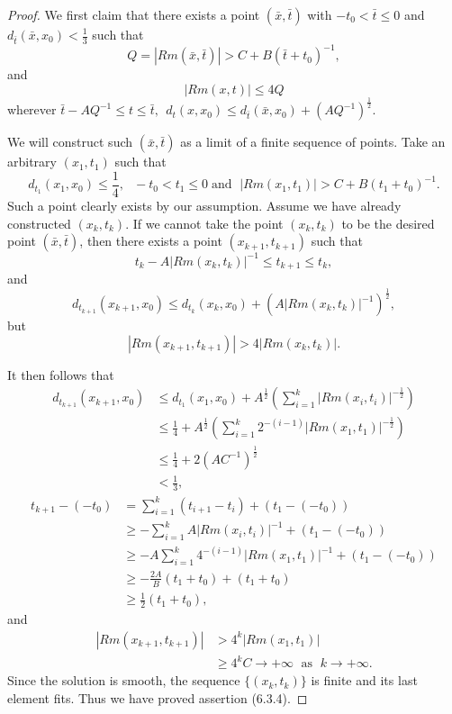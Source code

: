 \begin{proof}
We first claim that there exists a point $(\bar{x},\bar{t})$ with
$-t_0<\bar{t}\leq 0$ and $d_{\bar{t}}(\bar{x},x_0)<\frac{1}{3}$
such that
$$
Q=|Rm(\bar{x},\bar{t})|>C+ B(\bar{t}+t_0)^{-1},
$$
and \begin{equation}
|Rm(x,t)|\leq 4Q %
\end{equation} wherever $\bar{t}-AQ^{-1}\leq t\leq \bar{t},\ \ d_t(x,x_0)\leq
d_{\bar{t}}(\bar{x},x_0) +(AQ^{-1})^{\frac{1}{2}}.$

We will construct such $(\bar{x},\bar{t})$ as a limit of a finite
sequence of points.  Take an arbitrary $(x_1,t_1)$ such that
$$
d_{t_1}(x_1,x_0)\leq \frac{1}{4},\ \ \ -t_0<t_1\leq 0 \; \mbox{
and } \;|Rm(x_1,t_1)|>C+B(t_1+t_0)^{-1}.
$$
Such a point clearly exists by our assumption. Assume we have
already constructed $(x_k,t_k).$ If we cannot take the point
$(x_k,t_k)$ to be the desired point $(\bar{x},\bar{t})$, then
there exists a point $(x_{k+1},t_{k+1})$ such that
$$
t_k-A|Rm(x_k,t_k)|^{-1}\leq t_{k+1}\leq t_k,
$$
and
$$
d_{t_{k+1}}(x_{k+1},x_0) \leq
d_{t_{k}}(x_{k},x_0)+(A|Rm(x_k,t_k)|^{-1})^{\frac{1}{2}},
$$
but
$$
|Rm(x_{k+1},t_{k+1})|>4|Rm(x_k,t_k)|.$$

\vskip 0.1cm\noindent It then follows that
\begin{align*}
d_{t_{k+1}}(x_{k+1},x_0)& \leq
d_{t_{1}}(x_{1},x_0)+A^{\frac{1}{2}}
\left(\sum\limits_{i=1}^k|Rm(x_i,t_i)|^{-\frac{1}{2}}\right)\\
&  \leq \frac{1}{4}+A^{\frac{1}{2}}
\left(\sum\limits_{i=1}^k2^{-(i-1)}|Rm(x_1,t_1)|^{-\frac{1}{2}}\right)\\
&  \leq \frac{1}{4}+2(AC^{-1})^{\frac{1}{2}} \\
&  < \frac{1}{3},
\end{align*}
\begin{displaymath}
\begin{split}
t_{k+1}-(-t_0)&  =\sum_{i=1}^k(t_{i+1}-t_i)+(t_1-(-t_0))\\[1mm]
&  \geq-\sum_{i=1}^kA|Rm(x_i,t_i)|^{-1}+(t_1-(-t_0))\\[1mm]
&  \geq-A\sum_{i=1}^k4^{-(i-1)}|Rm(x_1,t_1)|^{-1}+(t_1-(-t_0))\\[1mm]
&  \geq-\frac{2A}{B}(t_1+t_0)+(t_1+t_0)\\[1mm]
&  \geq\frac{1}{2}(t_1+t_0),
\end{split}
\end{displaymath}
and
\begin{align*}
|Rm(x_{k+1},t_{k+1})|&  > 4^k|Rm(x_1,t_1)| \\
&  \geq 4^kC\rightarrow +\infty\; \mbox{ as } \;
k\rightarrow+\infty.
\end{align*}
Since the solution is smooth, the sequence $\{(x_k, t_k)\}$ is
finite and its last element fits. Thus we have proved  assertion
(6.3.4).


\end{proof}

